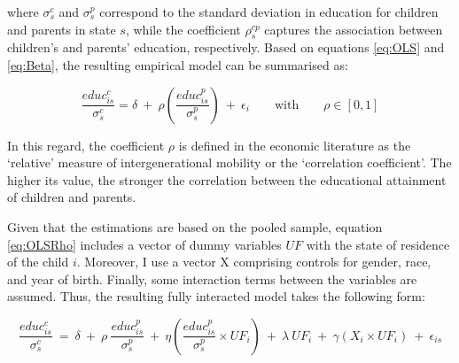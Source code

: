\documentclass[a4paper, 12pt]{article}
\begin{document}
where $\sigma^{c}_s$ and $\sigma^{p}_s$ correspond to the standard deviation in education for children and parents in state $s$, while the coefficient $\rho^{cp}_s$ captures the association between children’s and parents’ education, respectively. Based on equations \eqref{eq:OLS} and \eqref{eq:Beta}, the resulting empirical model can be summarised as:


\begin{equation} \label{eq:OLSRho}
\frac{educ^c_{is}}{\sigma^c_s}=\delta \:+\: \rho \left(\frac{educ^p_{is}}{\sigma^p_s}\right) \:+\: \epsilon_i \qquad \textrm{with} \qquad \rho \in [0,1]
\end{equation}

In this regard, the coefficient $\rho$ is defined in the economic literature as the ‘relative’ measure of intergenerational mobility or the ‘correlation coefficient’. The higher its value, the stronger the correlation between the educational attainment of children and parents. 

Given that the estimations are based on the pooled sample, equation \eqref{eq:OLSRho} includes a vector of dummy variables $UF$ with the state of residence of the child $i$. Moreover, I use a vector X comprising controls for gender, race, and year of birth. Finally, some interaction terms between the variables are assumed. Thus, the resulting fully interacted model takes the following form:

\begin{dmath} \label{eq:OLSFixed}
\frac{educ^c_{is}}{\sigma^c_s} \:=\: \delta \:+\: \rho \: \frac{educ^p_{is}}{\sigma^p_s} \:+\: \eta \left(\frac{educ^p_{is}}{\sigma^p_s} \times UF_i \right) \:+\: \lambda \: UF_i \:+\: \gamma \left(X_i \times UF_i \right) \:+\: \epsilon_{is}
\end{dmath}




\end{document}
